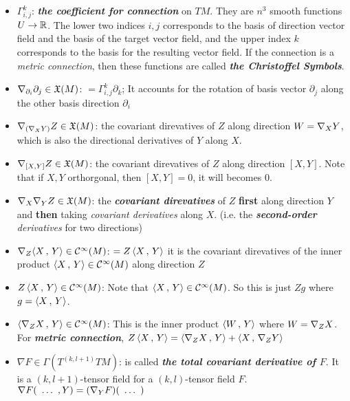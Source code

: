 \documentclass[11pt]{article}
\begin{document}
\begin{itemize}
\item $\Gamma_{i,j}^{k}$: \quad \emph{\textbf{the coefficient for connection}} on $TM$. They are  $n^3$ smooth functions $U \rightarrow {\mathbb R}$. The lower two indices $i,j$ corresponds to the basis of direction vector field and the basis of the target vector field, and the upper index $k$ corresponds to the basis for the resulting vector field. If the connection is a \emph{metric connection}, then these functions are called \emph{\textbf{the Christoffel Symbols}}.

\item $\nabla_{\partial_i}{\partial_j} \in {\mathfrak X}(M)$: \quad $= \Gamma_{i,j}^{k}\partial_k$; It accounts for the rotation of basis vector $\partial_j$ along the other basis direction $\partial_i$


\item $\nabla_{(\nabla_{X}{Y})}{Z} \in {\mathfrak X}(M)$: \quad the covariant direvatives of $Z$ along direction $W = \nabla_{X}{Y}$, which is also the directional derivatives of $Y$ along  $X$.

\item $\nabla_{[X, Y]}{Z} \in {\mathfrak X}(M)$: \quad the covariant direvatives of $Z$ along direction $[X, Y]$. Note that if $X, Y$ orthorgonal, then $[X,Y] = 0$, it will becomes $0$.


\item $\nabla_{X}{\nabla_{Y}{Z}} \in {\mathfrak X}(M)$: \quad the \emph{\textbf{covariant direvatives}} of $Z$ \textbf{first} along direction $Y$ and \textbf{then} taking \emph{covariant derivatives} along $X$. (i.e. the \emph{\textbf{second-order} derivatives} for two directions)


\item $\nabla_{Z}{\left\langle X\,,\, Y \right\rangle} \in {\mathcal C}^{\infty}(M)$: \quad $= Z\left\langle X\,,\, Y \right\rangle$ it is the covariant direvatives of the inner product $\left\langle X\,,\, Y \right\rangle \in {\mathcal C}^{\infty}(M)$ along direction $Z$

\item $Z\left\langle X\,,\, Y \right\rangle  \in {\mathcal C}^{\infty}(M)$: \quad Note that $\left\langle X\,,\, Y \right\rangle \in {\mathcal C}^{\infty}(M)$. So this is just $Zg$ where $g = \left\langle X\,,\, Y \right\rangle$.

\item $\left\langle \nabla_{Z}{X}\,,\, Y \right\rangle \in {\mathcal C}^{\infty}(M)$: \quad This is the inner product $\left\langle W\,,\, Y \right\rangle$ where $W = \nabla_{Z}{X}$. For \emph{\textbf{metric connection}}, 
$Z\left\langle X\,,\, Y \right\rangle = \left\langle \nabla_{Z}{X}\,,\, Y \right\rangle + \left\langle X\,,\, \nabla_{Z}{Y} \right\rangle $

\item $\nabla F \in \Gamma(T^{(k, l+1)}TM)$: \quad is called \emph{\textbf{the total covariant derivative of $F$}}. It is a $(k, l+1)$-tensor field for a $(k,l)$-tensor field $F$. $\nabla F(\,{\,}\ldots{\,}\,, Y) =( \nabla_{Y}F)(\,{\,}\ldots{\,}\,)$


\end{itemize}
\end{document}
